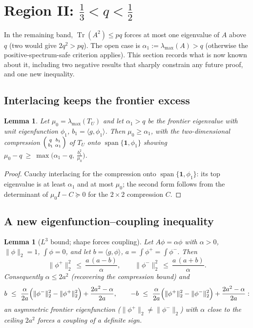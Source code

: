 \documentclass[11pt]{article}
\newtheorem{lemma}[theorem]{Lemma}
\newcommand{\one}{\mathbf 1}
\newcommand{\ip}[2]{\langle #1,#2\rangle}
\newcommand{\Tr}{\operatorname{Tr}}
\newcommand{\norm}[1]{\lVert #1\rVert}
\begin{document}
\section{Region II: $\tfrac13<q<\tfrac12$}\label{sec:region2}

In the remaining band, $\Tr(A^2)\le pq$ forces at most one eigenvalue of $A$ above $q$ (two would give $2q^2>pq$).  The open case is $\alpha_1:=\lambda_{\max}(A)>q$ (otherwise the positive-spectrum-safe criterion applies).  This section records what is now known about it, including two negative results that sharply constrain any future proof, and one new inequality.

\subsection{Interlacing keeps the frontier excess}

\begin{lemma}\label{lem:interlace}
Let $\mu_0=\lambda_{\max}(T_U)$ and let $\alpha_1>q$ be the frontier eigenvalue with unit eigenfunction $\phi_1$, $b_1=\ip{g}{\phi_1}$.  Then $\mu_0\ge\alpha_1$, with the two-dimensional compression $\begin{psmallmatrix}q&b_1\\ b_1&\alpha_1\end{psmallmatrix}$ of $T_U$ onto $\operatorname{span}\{\one,\phi_1\}$ showing $\mu_0-q\ \ge\ \max\bigl(\alpha_1-q,\ \tfrac{b_1^2}{\mu_0}\bigr)$.
\end{lemma}

\begin{proof}
Cauchy interlacing for the compression onto $\operatorname{span}\{\one,\phi_1\}$: its top eigenvalue is at least $\alpha_1$ and at most $\mu_0$; the second form follows from the determinant of $\mu_0 I-C\succeq0$ for the $2\times2$ compression $C$.
\end{proof}

\subsection{A new eigenfunction--coupling inequality}

\begin{lemma}[$L^3$ bound; shape forces coupling]\label{lem:L3}
Let $A\phi=\alpha\phi$ with $\alpha>0$, $\norm\phi_2=1$, $\int\phi=0$, and let $b=\ip{g}{\phi}$, $a=\int\phi^+=\int\phi^-$.  Then
\[
        \norm{\phi^+}_2^2\ \le\ \frac{a\,(a-b)}{\alpha},
        \qquad
        \norm{\phi^-}_2^2\ \le\ \frac{a\,(a+b)}{\alpha}.
\]
Consequently $\alpha\le2a^2$ (recovering the compression bound) and
\begin{equation}\label{eq:asym-coupling}
        b\ \le\ \frac{\alpha}{2a}\Bigl(\norm{\phi^-}_2^2-\norm{\phi^+}_2^2\Bigr)
        +\frac{2a^2-\alpha}{2a},
        \qquad
        -b\ \le\ \frac{\alpha}{2a}\Bigl(\norm{\phi^+}_2^2-\norm{\phi^-}_2^2\Bigr)
        +\frac{2a^2-\alpha}{2a}:
\end{equation}
an asymmetric frontier eigenfunction ($\norm{\phi^+}_2\neq\norm{\phi^-}_2$) with $\alpha$ close to the ceiling $2a^2$ forces a coupling of a definite sign.
\end{lemma}
\end{document}
